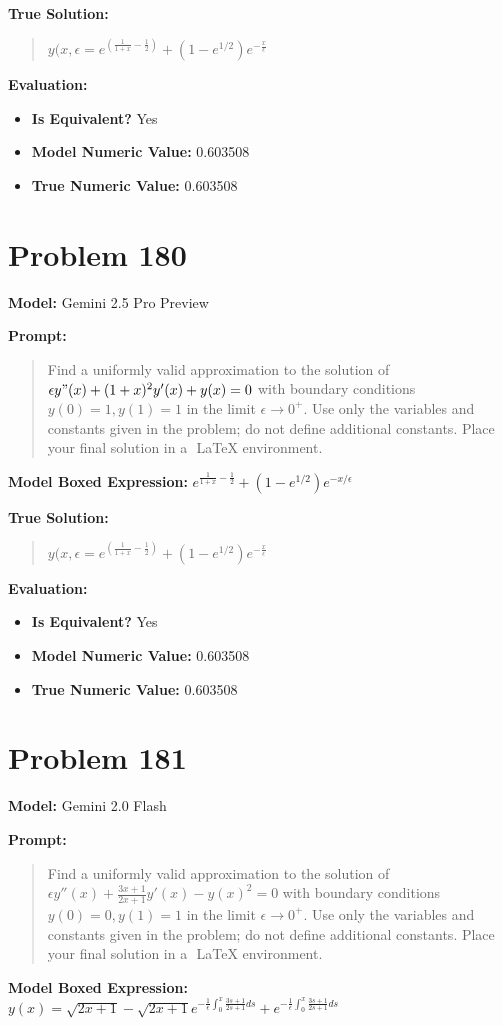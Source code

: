 \documentclass{article}
\begin{document}
{\textbf{True Solution:}
\begin{quote}
$y(x, \epsilon = e^{(\frac{1}{1+x} - \frac{1}{2})} + (1-e^{1/2})e^{-\frac{x}{\epsilon}}$
\end{quote}

\textbf{Evaluation:}
\begin{itemize}
\item \textbf{Is Equivalent?} Yes
\item \textbf{Model Numeric Value:} 0.603508
\item \textbf{True Numeric Value:} 0.603508
\end{itemize}
\vspace{1cm}
\section*{Problem 180}
\textbf{Model:} Gemini 2.5 Pro Preview

\textbf{Prompt:}
\begin{quote}
Find a uniformly valid approximation to the solution of $\epsilon y"(x) + (1 + x)^2 y'(x) + y(x) = 0$ with boundary conditions $y(0) = 1, y(1) = 1$ in the limit $\epsilon \to 0^+$. Use only the variables and constants given in the problem; do not define additional constants. Place your final solution in a $\boxed{}$ LaTeX environment.
\end{quote}
\textbf{Model Boxed Expression:} $e^{\frac{1}{1+x} - \frac{1}{2}} + (1-e^{1/2})e^{-x/\epsilon}$

\textbf{True Solution:}
\begin{quote}
$y(x, \epsilon = e^{(\frac{1}{1+x} - \frac{1}{2})} + (1-e^{1/2})e^{-\frac{x}{\epsilon}}$
\end{quote}

\textbf{Evaluation:}
\begin{itemize}
\item \textbf{Is Equivalent?} Yes
\item \textbf{Model Numeric Value:} 0.603508
\item \textbf{True Numeric Value:} 0.603508
\end{itemize}
\vspace{1cm}
\section*{Problem 181}
\textbf{Model:} Gemini 2.0 Flash

\textbf{Prompt:}
\begin{quote}
Find a uniformly valid approximation to the solution of $\epsilon y''(x) + \frac{3x+1}{2x+1}y'(x) - y(x)^{2} = 0$ with boundary conditions $y(0)=0, y(1)=1$ in the limit $\epsilon \to 0^+$. Use only the variables and constants given in the problem; do not define additional constants. Place your final solution in a $\boxed{}$ LaTeX environment.
\end{quote}
\textbf{Model Boxed Expression:} $y(x) = \sqrt{2x+1} - \sqrt{2x+1}e^{-\frac{1}{\epsilon}\int_0^x \frac{3s+1}{2s+1} ds} + e^{-\frac{1}{\epsilon}\int_0^x \frac{3s+1}{2s+1} ds}$

}
\end{document}
